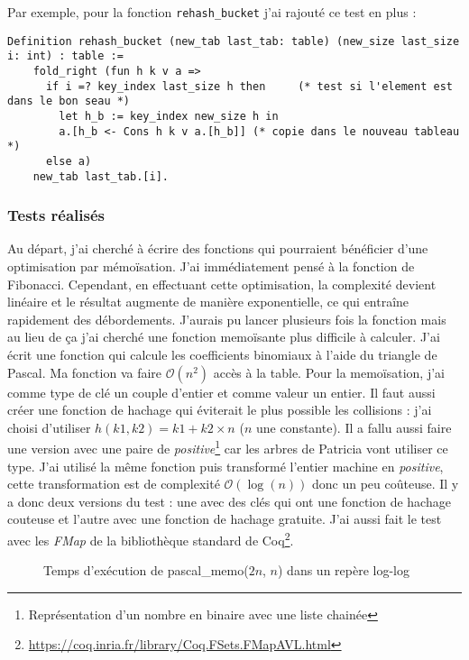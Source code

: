\documentclass{article}
\begin{document}
Par exemple, pour la fonction \texttt{rehash\_bucket} j'ai rajouté ce test en
plus :

\begin{lstlisting}[language=Coq]
  Definition rehash_bucket (new_tab last_tab: table) (new_size last_size i: int) : table :=
    fold_right (fun h k v a =>
      if i =? key_index last_size h then     (* test si l'element est dans le bon seau *)
        let h_b := key_index new_size h in
        a.[h_b <- Cons h k v a.[h_b]] (* copie dans le nouveau tableau *)
      else a)
    new_tab last_tab.[i].
\end{lstlisting}

      \subsubsection{Tests réalisés}

  Au départ, j'ai cherché à écrire des fonctions qui pourraient
bénéficier d'une optimisation par mémoïsation. J'ai immédiatement pensé à la
fonction de Fibonacci. Cependant, en effectuant cette optimisation, la
complexité devient linéaire et le résultat augmente de manière exponentielle,
ce qui entraîne rapidement des débordements. J'aurais pu lancer plusieurs fois la
fonction mais au lieu de ça j'ai cherché une fonction memoïsante plus
difficile à calculer. J'ai écrit une fonction qui calcule
les coefficients binomiaux à l'aide du triangle de Pascal. Ma fonction va faire
$\mathcal{O}(n^2)$ accès à la table. Pour la memoïsation, j'ai comme type
de clé un couple d'entier et comme valeur un entier. Il faut aussi créer une
fonction de hachage qui éviterait le plus possible les collisions : j'ai
choisi d'utiliser $h(k1, k2)= k1 + k2 \times n$ ($n$ une constante).
Il a fallu aussi faire une version avec une paire de
\textit{positive}\footnote{Représentation d'un nombre
en binaire avec une liste chainée} car les arbres de Patricia vont utiliser ce
type. J'ai utilisé la même fonction puis transformé l'entier
machine en \textit{positive}, cette transformation est de complexité
$\mathcal{O}(\log(n))$ donc un peu coûteuse. Il y a donc deux versions du
test : une avec des clés qui ont une fonction de hachage couteuse et l'autre
avec une fonction de hachage gratuite. J'ai aussi fait le test avec les
\textit{FMap} de la bibliothèque standard de Coq\footnote{
\url{https://coq.inria.fr/library/Coq.FSets.FMapAVL.html}}.

\begin{figure}[ht]
  \centering
  \scalebox{.7}{}
  \caption{Temps d'exécution de pascal\_memo($2n$, $n$) dans un repère log-log}
  \label{fig:pascal}
\end{figure}
\end{document}
